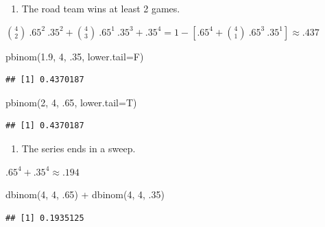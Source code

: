 \documentclass[
]{book}
\newenvironment{Shaded}{\begin{snugshade}}{\end{snugshade}}
\newcommand{\AttributeTok}[1]{\textcolor[rgb]{0.77,0.63,0.00}{#1}}
\newcommand{\DecValTok}[1]{\textcolor[rgb]{0.00,0.00,0.81}{#1}}
\newcommand{\FloatTok}[1]{\textcolor[rgb]{0.00,0.00,0.81}{#1}}
\newcommand{\FunctionTok}[1]{\textcolor[rgb]{0.00,0.00,0.00}{#1}}
\newcommand{\NormalTok}[1]{#1}
\newcommand{\SpecialCharTok}[1]{\textcolor[rgb]{0.00,0.00,0.00}{#1}}
\providecommand{\tightlist}{%
  \setlength{\itemsep}{0pt}\setlength{\parskip}{0pt}}
\theoremstyle{definition}
\theoremstyle{definition}
\theoremstyle{definition}
\theoremstyle{definition}
\theoremstyle{remark}
\begin{document}
\begin{enumerate}
\def\labelenumi{(\alph{enumi})}
\setcounter{enumi}{2}
\tightlist
\item
  The road team wins at least 2 games.
\end{enumerate}

\(\binom{4}{2}\ .65^2\ .35^2 + \binom{4}{3}\ .65^1\ .35^3 + .35^4 = 1 - [.65^4 + \binom{4}{1}\ .65^3\ .35^1] \approx .437\)

\begin{Shaded}
\begin{Highlighting}[]
\FunctionTok{pbinom}\NormalTok{(}\FloatTok{1.9}\NormalTok{, }\DecValTok{4}\NormalTok{, .}\DecValTok{35}\NormalTok{, }\AttributeTok{lower.tail=}\NormalTok{F)}
\end{Highlighting}
\end{Shaded}

\begin{verbatim}
## [1] 0.4370187
\end{verbatim}

\begin{Shaded}
\begin{Highlighting}[]
\FunctionTok{pbinom}\NormalTok{(}\DecValTok{2}\NormalTok{, }\DecValTok{4}\NormalTok{, .}\DecValTok{65}\NormalTok{, }\AttributeTok{lower.tail=}\NormalTok{T)}
\end{Highlighting}
\end{Shaded}

\begin{verbatim}
## [1] 0.4370187
\end{verbatim}

\begin{enumerate}
\def\labelenumi{(\alph{enumi})}
\setcounter{enumi}{3}
\tightlist
\item
  The series ends in a sweep.
\end{enumerate}

\(.65^4 + .35^4 \approx .194\)

\begin{Shaded}
\begin{Highlighting}[]
\FunctionTok{dbinom}\NormalTok{(}\DecValTok{4}\NormalTok{, }\DecValTok{4}\NormalTok{, .}\DecValTok{65}\NormalTok{) }\SpecialCharTok{+} \FunctionTok{dbinom}\NormalTok{(}\DecValTok{4}\NormalTok{, }\DecValTok{4}\NormalTok{, .}\DecValTok{35}\NormalTok{)}
\end{Highlighting}
\end{Shaded}

\begin{verbatim}
## [1] 0.1935125
\end{verbatim}
\end{document}
